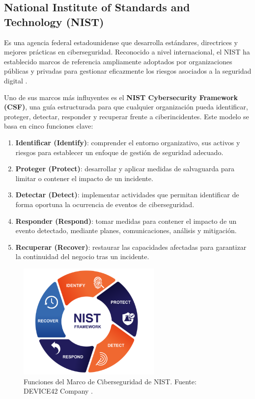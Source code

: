 \documentclass[a4paper, 11pt]{article}
\begin{document}
\subsection*{National Institute of Standards and Technology (NIST)}

Es una agencia federal estadounidense que desarrolla estándares, directrices y mejores prácticas en ciberseguridad. Reconocido a nivel internacional, el NIST ha establecido marcos de referencia ampliamente adoptados por organizaciones públicas y privadas para gestionar eficazmente los riesgos asociados a la seguridad digital \cite{nist}.

Uno de sus marcos más influyentes es el \textbf{NIST Cybersecurity Framework (CSF)}, una guía estructurada para que cualquier organización pueda identificar, proteger, detectar, responder y recuperar frente a ciberincidentes. Este modelo se basa en cinco funciones clave:
\begin{enumerate}
\item \textbf{Identificar (Identify)}: comprender el entorno organizativo, sus activos y riesgos para establecer un enfoque de gestión de seguridad adecuado.
\item \textbf{Proteger (Protect)}: desarrollar y aplicar medidas de salvaguarda para limitar o contener el impacto de un incidente.
\item \textbf{Detectar (Detect)}: implementar actividades que permitan identificar de forma oportuna la ocurrencia de eventos de ciberseguridad.
\item \textbf{Responder (Respond)}: tomar medidas para contener el impacto de un evento detectado, mediante planes, comunicaciones, análisis y mitigación.
\item \textbf{Recuperar (Recover)}: restaurar las capacidades afectadas para garantizar la continuidad del negocio tras un incidente.
\end{enumerate}

\begin{figure}[H]
\centering
\includegraphics[width=7cm]{images/nist_framework.png}
\caption{Funciones del Marco de Ciberseguridad de NIST. Fuente: DEVICE42 Company \cite{device42}.}
\label{fig:nist-framework}
\end{figure}
\end{document}
